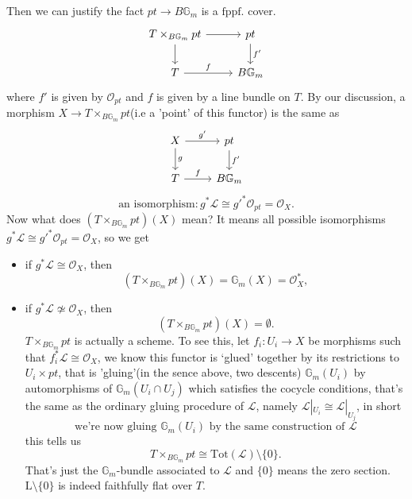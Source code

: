 \documentclass[main.tex]{subfiles}
\begin{document}
\begin{example}
Then we can justify the fact $pt\rightarrow B\mathbb{G}_{m}$ is a $\mathrm{fppf}.$ cover.
$$\begin{tikzcd}
T\times_{B\mathbb{G}_{m}}pt\arrow{r}\arrow{d} & pt\arrow{d}{f'}\\
T\arrow{r}{f}& B\mathbb{G}_{m}\end{tikzcd}$$
where $f'$ is given by $\mathcal{O}_{pt}$ and $f$ is given by a line bundle on $T$. By our discussion, a morphism $X\rightarrow T\times_{B\mathbb{G}_{m}}pt$(i.e a 'point' of this functor) is the same as 
$$\begin{tikzcd}
X\arrow{r}{g'}\arrow{d}{g} & pt\arrow{d}{f'}\\
T\arrow{r}{f}& B\mathbb{G}_{m}\end{tikzcd}$$
$$\text{an isomorphism}: g^{*}\mathcal{L}\cong g'^{*}\mathcal{O}_{pt}=\mathcal{O}_{X}.$$
Now what does $(T\times_{B\mathbb{G}_{m}}pt)(X)$ mean? It means all possible isomorphisms $g^{*}\mathcal{L}\cong g'^{*}\mathcal{O}_{pt}=\mathcal{O}_{X}$, so we get 
\begin{itemize}
\item if $g^{*}\mathcal{L}\cong \mathcal{O}_{X}$, then $$(T\times_{B\mathbb{G}_{m}}pt)(X)=\mathbb{G}_{m}(X)=\mathcal{O}_{X}^{*},$$
\item if $g^{*}\mathcal{L}\not\simeq \mathcal{O}_{X}$, then $$(T\times_{B\mathbb{G}_{m}}pt)(X)=\emptyset.$$
$T\times_{B\mathbb{G}_{m}}pt$ is actually a scheme. To see this, let $f_{i}:U_{i}\rightarrow X$ be morphisms such that $f_{i}^{*}\mathcal{L}\cong \mathcal{O}_{X}$,  we know this functor is `glued' together by its restrictions to $U_{i}\times pt$, that is 'gluing'(in the sence above, two descents) $\mathbb{G}_{m}(U_{i})$ by automorphisms of $\mathbb{G}_{m}(U_{i}\cap U_{j})$ which satisfies the cocycle conditions, that's the same as the ordinary gluing procedure of $\mathcal{L}$, namely $\mathcal{L}|_{U_{i}}\cong \mathcal{L}|_{U_{j}}$, in short
$$\text{we're now gluing $\mathbb{G}_{m}(U_{i})$ by the same construction of $\mathcal{L}$}$$
this tells us
$$T\times_{B\mathbb{G}_{m}}pt\cong \mathrm{Tot}(\mathcal{L})\setminus\{0\}.$$
That's just the $\mathbb{G}_{m}$-bundle associated to $\mathcal{L}$ and $\{0\}$ means the zero section. $\mathrm{L}\setminus \{0\}$ is indeed faithfully flat over $T$.
\end{itemize}
\end{example}
\end{document}
